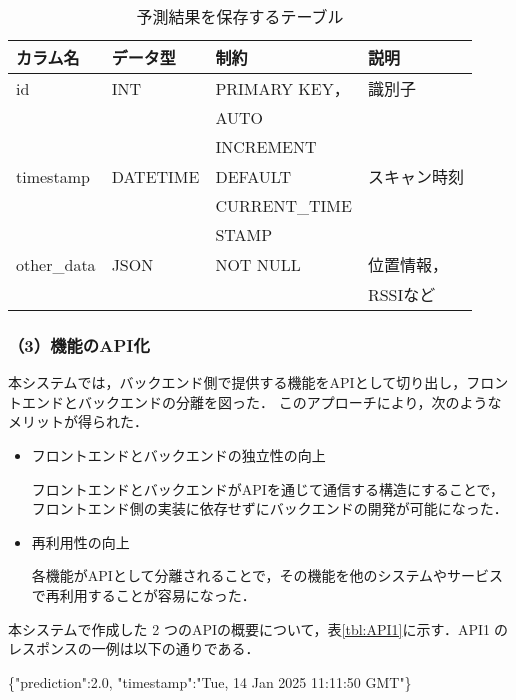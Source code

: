 \begin{table}[tb]
	\centering
	\caption{予測結果を保存するテーブル}
	\label{tbl:prediction_table}
	\small
	\setlength{\tabcolsep}{4pt}
	\doublerulesep=0.3pt
	\begin{tabular}{l|l|l|l} \hline\hline\hline
		カラム名 & データ型 & 制約 & 説明 \\ \hline
		id & INT & PRIMARY KEY， &  識別子 \\
		&&AUTO& \\
		&&INCREMENT& \\ \hline
		timestamp & DATETIME & DEFAULT  & スキャン時刻 \\
		&&CURRENT\_TIME& \\
		&&STAMP& \\ \hline
		other\_data & JSON & NOT NULL & 位置情報，\\
		&&&RSSIなど \\ \hline\hline\hline
	\end{tabular}
\end{table}

\subsubsection*{（3）機能のAPI化}
本システムでは，バックエンド側で提供する機能をAPIとして切り出し，フロントエンドとバックエンドの分離を図った．
このアプローチにより，次のようなメリットが得られた．

\begin{itemize}
	\item フロントエンドとバックエンドの独立性の向上
	
	フロントエンドとバックエンドがAPIを通じて通信する構造にすることで，フロントエンド側の実装に依存せずにバックエンドの開発が可能になった．
	
	\item 再利用性の向上
	 
	各機能がAPIとして分離されることで，その機能を他のシステムやサービスで再利用することが容易になった．
	
\end{itemize}

本システムで作成した 2 つのAPIの概要について，表\ref{tbl:API1}に示す．API\textcircled{1}のレスポンスの一例は以下の通りである．

\begin{minipage}{.45\textwidth}
	\begin{screen}
		\ttfamily
		\{"prediction":2.0, \newline"timestamp":"Tue, 14 Jan 2025 11:11:50 GMT"\}
	\end{screen}			
\end{minipage}

